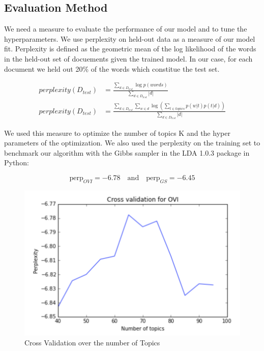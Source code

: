 \documentclass[twoside]{article}
\begin{document}
\begin{multicols}{2}
\subsection{Evaluation Method}

We need a measure to evaluate the performance of our model and to tune the hyperparameters. We use perplexity on held-out data as a measure of our model fit. Perplexity is defined as the geometric mean of the log likelihood of the words in the held-out set of docuements given the trained model. In our case, for each document we held out 20\% of the words which constitue the test set.

\begin{align*}
	perplexity(D_{test}) & = \frac{\sum\limits_{d \in D_{test}} \log p(words)}{\sum\limits_{d \in D_{test}}|d|}\\
	perplexity(D_{test}) & = \frac{\sum\limits_{d \in D_{test}} \sum\limits_{w \in d} \log \left( \sum_{t \in topics} p(w|t)p(t|d) \right)}{\sum\limits_{d \in D_{test}}|d|}
\end{align*}

\noindent We used this measure to optimize the number of topics K and the hyper parameters of the optimization. We also used the perplexity on the training set to benchmark our algorithm with the Gibbs sampler in the LDA 1.0.3 package in Python:

$$\text{perp}_{OVI} = -6.78 \quad \text{and} \quad \text{perp}_{GS} = -6.45$$

\begin{figure}[H]
\centering
\includegraphics[width=1\linewidth]{V.png}
\caption{Cross Validation over the number of Topics}
\end{figure}


\end{multicols}
\end{document}
